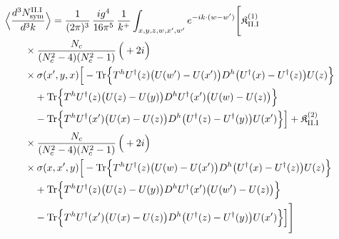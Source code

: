 \begin{align}\label{eq:S-II.I-3}
&\Big\langle\frac{d^{3}N^{\rm II.I}_{{\rm sym}}}{d^{3}k}\Big\rangle=\frac{1}{(2\pi)^{3}}\, \frac{ig^{4}}{16\pi^{5}}\, \frac{1}{k^{+}} \int_{x,y,z,w,x',w'}e^{-ik\cdot(w-w')}\Bigg[ \mathfrak{K}^{(1)}_{\rm II.I}\notag\\
&\quad\quad \times \frac{N_{c}}{(N_{c}^{2}-4)(N_{c}^{2}-1)}\, \Big(+2i\Big)\notag\\
&\quad\quad \times \sigma(x',y,x)\Big[-{\rm Tr}\Big\{T^{h}U^{\dagger}(z)\big(U(w')-U(x')\big)D^{h}\big(U^{\dagger}(x)-U^{\dagger}(z)\big)U(z)\Big\}\notag\\
&\quad\quad\quad +{\rm Tr}\Big\{T^{h}U^{\dagger}(z)\big(U(z)-U(y)\big)D^{h}U^{\dagger}(x')\big(U(w)-U(z)\big)\Big\}\notag\\
&\quad\quad\quad -{\rm Tr}\Big\{T^{h}U^{\dagger}(x')\big(U(x)-U(z)\big)D^{h}\big(U^{\dagger}(z)-U^{\dagger}(y)\big)U(x')\Big\}\Big] + \mathfrak{K}^{(2)}_{\rm II.I}\notag\\
&\quad\quad \times \frac{N_{c}}{(N_{c}^{2}-4)(N_{c}^{2}-1)}\, \Big(+2i\Big)\notag\\
&\quad\quad \times \sigma(x,x',y)\Big[-{\rm Tr}\Big\{T^{h}U^{\dagger}(z)\big(U(w)-U(x')\big)D^{h}\big(U^{\dagger}(x)-U^{\dagger}(z)\big)U(z)\Big\}\notag\\
&\quad\quad\quad +{\rm Tr}\Big\{T^{h}U^{\dagger}(z)\big(U(z)-U(y)\big)D^{h}U^{\dagger}(x')\big(U(w')-U(z)\big)\Big\}\notag\\
&\quad\quad\quad -{\rm Tr}\Big\{T^{h}U^{\dagger}(x')\big(U(x)-U(z)\big)D^{h}\big(U^{\dagger}(z)-U^{\dagger}(y)\big)U(x')\Big\}\Big]\Bigg]
\end{align}
